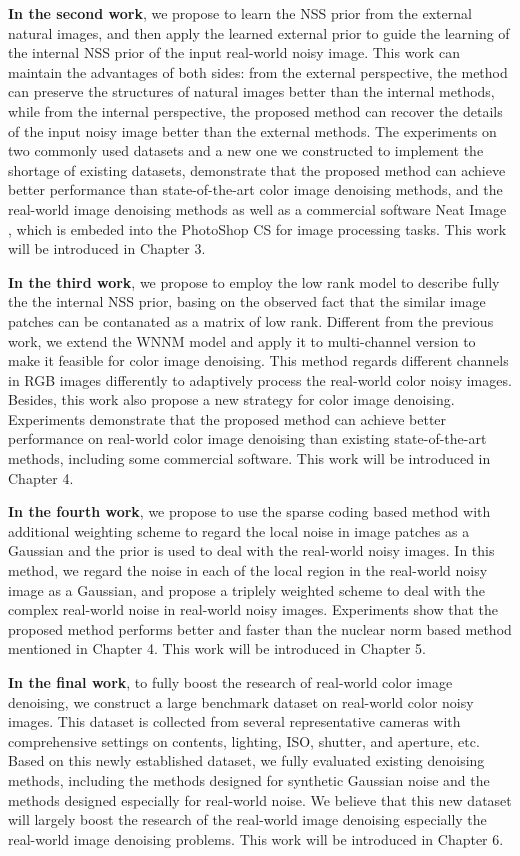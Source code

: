 \textbf{In the second work}, we propose to learn the NSS prior from the external natural images, and then apply the learned external prior to guide the learning of the internal NSS prior of the input real-world noisy image. This work can maintain the advantages of both sides: from the external perspective, the method can preserve the structures of natural images better than the internal methods, while from the internal perspective, the proposed method can recover the details of the input noisy image better than the external methods. The experiments on two commonly used datasets and a new one we constructed to implement the shortage of existing datasets, demonstrate that the proposed method can achieve better performance than state-of-the-art color image denoising methods, and the real-world image denoising methods as well as a commercial software Neat Image \cite{neatimage}, which is embeded into the PhotoShop CS for image processing tasks. This work will be introduced in Chapter 3.


\textbf{In the third work}, we propose to employ the low rank model to describe fully the the internal NSS prior, basing on the observed fact that the similar image patches can be contanated as a matrix of low rank. Different from the previous work, we extend the WNNM model \cite{wnnm} and apply it to multi-channel version to make it feasible for color image denoising. This method regards different channels in RGB images differently to adaptively process the real-world color noisy images. Besides, this work also propose a new strategy for color image denoising. Experiments demonstrate that the proposed method can achieve better performance on real-world color image denoising than existing state-of-the-art methods, including some commercial software. This work will be introduced in Chapter 4.


\textbf{In the fourth work}, we propose to use the sparse coding based method with additional weighting scheme to regard the local noise in image patches as a Gaussian and the prior is used to deal with the real-world noisy images. In this method, we regard the noise in each of the local region in the real-world noisy image as a Gaussian, and propose a triplely weighted scheme to deal with the complex real-world noise in real-world noisy images. Experiments show that the proposed method performs better and faster than the nuclear norm based method mentioned in Chapter 4. This work will be introduced in Chapter 5.


\textbf{In the final work}, to fully boost the research of real-world color image denoising, we construct a large benchmark dataset on real-world color noisy images. This dataset is collected from several representative cameras with comprehensive settings on contents, lighting, ISO, shutter, and aperture, etc. Based on this newly established dataset, we fully evaluated existing denoising methods, including the methods designed for synthetic Gaussian noise and the methods designed especially for real-world noise. We believe that this new dataset will largely boost the research of the real-world image denoising especially the real-world image denoising problems. This work will be introduced in Chapter 6.


